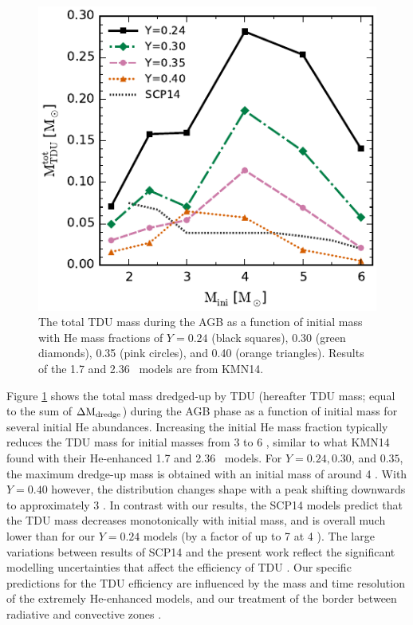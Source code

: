 \begin{figure}
 \begin{center}\includegraphics[width=\columnwidth]{fig-tdumass.pdf}\end{center}
 \caption{The total TDU mass during the AGB as a function of initial mass with He mass fractions of $Y= 0.24$ (black squares), 0.30 (green diamonds), 0.35 (pink circles), and 0.40 (orange triangles). Results of the 1.7 and 2.36 \Msun\ models are from KMN14.}\label{fig:tdumass}
\end{figure}

Figure \ref{fig:tdumass} shows the total mass dredged-up by TDU (hereafter TDU mass; equal to the sum of $\Delta\mathrm{M}_\mathrm{dredge}$) during the AGB phase as a function of initial mass for several initial He abundances. Increasing the initial He mass fraction typically reduces the TDU mass for initial masses from 3 to 6 \Msun, similar to what KMN14 found with their He-enhanced 1.7 and 2.36 \Msun\ models. For $Y=0.24,0.30$, and $0.35$, the maximum dredge-up mass is obtained with an initial mass of around 4 \Msun. With $Y=0.40$ however, the distribution changes shape with a peak shifting downwards to approximately 3 \Msun. In contrast with our results, the SCP14 models predict that the TDU mass decreases monotonically with initial mass, and is overall much lower than for our $Y=0.24$ models (by a factor of up to 7 at 4 \Msun). The large variations between results of SCP14 and the present work reflect the significant modelling uncertainties that affect the efficiency of TDU \citep[for a comparison of TDU efficiency between different evolution codes, see][]{Lugaro:2003ew}. Our specific predictions for the TDU efficiency are influenced by the mass and time resolution of the extremely He-enhanced models, and our treatment of the border between radiative and convective zones \citep[as demonstrated by][]{Frost:1996fu}.

